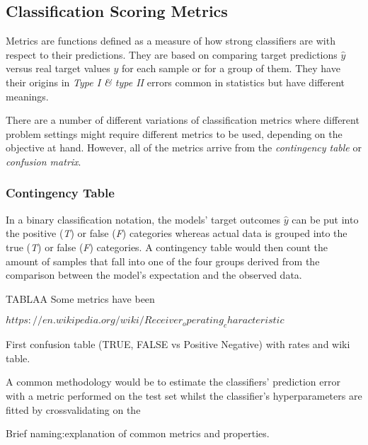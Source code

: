 \subsection{Classification Scoring Metrics}

Metrics are functions defined as a measure of how strong classifiers are with respect to their predictions. They are based on comparing target predictions $\hat{y}$ versus real target values $y$ for each sample or for a group of them. They have their origins in \textit{Type I \& type II} errors common in statistics but have different meanings. 

There are a number of different variations of classification metrics where different problem settings might require different metrics to be used, depending on the objective at hand. However, all of the metrics arrive from the \textit{contingency table} or \textit{confusion matrix}.

\subsubsection{Contingency Table}

In a binary classification notation, the models' target outcomes $\hat{y}$ can be put into the positive (\textit{T}) or false (\textit{F}) categories whereas actual data is grouped into the true (\textit{T}) or false (\textit{F}) categories. A contingency table would then count the amount of samples that fall into one of the four groups derived from the comparison between the model's expectation and the observed data. 

TABLAA
Some metrics have been 

$https://en.wikipedia.org/wiki/Receiver_operating_characteristic$

First confusion table (TRUE, FALSE vs Positive Negative) with rates and wiki table.

A common methodology would be to estimate the classifiers' prediction error with a metric performed on the test set whilst the classifier's hyperparameters are fitted by crossvalidating on the 

Brief naming:explanation of common metrics and properties.

